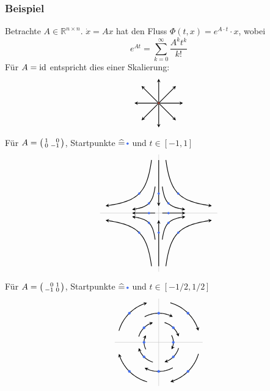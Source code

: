 \subsubsection[Beispiele für dynamische Systeme]{Beispiel} %
\label{ssub:252}
Betrachte $A \in \mathds{R}^{n \times n}$. $\dot x = A x$ hat den Fluss $\Phi(t,x) = e^{A \cdot t} \cdot  x$, wobei
\[
	e^{A t} = \sum_{k=0}^{\infty} \frac{A^k t^k}{k!}  
\]
Für $A= \operatorname{id}$ entspricht dies einer Skalierung:
\[
	\begin{tikzpicture}
		\foreach \x in {0,45,...,315}{
			\draw[arrows={-stealth}, thick] (0,0) -- (\x:1);
		}
		\draw[fill, Tomato3] (0,0) circle (0.03);
	\end{tikzpicture}
\]
Für $A = \begin{psmallmatrix*}[r]
	1 & 0 \\
	0 & -1
\end{psmallmatrix*}$, Startpunkte $\widehat{=}\,{\tikz[baseline=-0.5ex]{\draw[fill, RoyalBlue2] (0,0) circle[radius=0.04];}}$ und $t \in [-1, 1]$
\[
	\begin{tikzpicture}[scale=0.8]
		\draw[Gray0] (-3,0) -- (3,0);
		\draw[Gray0] (0,-3) -- (0,3);
		\begin{scope}
		\foreach \x/\y in {1/1, -1/-1, 1/-1, -1/1, 0.5/0.5, -0.5/-0.5, -0.5/0.5, 0.5/-0.5, 0/1, 0/-1, 0.5/0, -0.5/0}{
			\draw[thick, domain=-1:1, smooth, variable=\t, arrows={-stealth}] plot ({exp(\t)*\x},{exp(-\t)*\y});
			\draw[fill, RoyalBlue2] (\x,\y) circle[radius=0.05];
		}
		\end{scope}
	\end{tikzpicture}
\]
Für $A = \begin{psmallmatrix*}[r]
	0 & 1 \\
	-1 & 0
\end{psmallmatrix*}$, Startpunkte $\widehat{=}\,{\tikz[baseline=-0.5ex]{\draw[fill, RoyalBlue2] (0,0) circle[radius=0.04];}}$ und $t \in [-1/2, 1/2]$
\[
	\begin{tikzpicture}[scale=1.2]
		\draw[Gray0] (-1.5,0) -- (1.5,0);
		\draw[Gray0] (0,-1.5) -- (0,1.5);
		\begin{scope}
		\foreach \x/\y in {1/1, -1/-1, 1/-1, -1/1, 0.5/0.5, -0.5/-0.5, -0.5/0.5, 0.5/-0.5, 0/1, 0/-1, 0.5/0, -0.5/0}{
			\draw[thick, domain=-0.5:0.5, variable=\t, arrows={-stealth}] 
			plot ({\x*cos(deg(\t))+ \y*sin(deg(\t))},{-\x*sin(deg(\t))+ \y*cos(deg(\t))});
			\draw[fill, RoyalBlue2] (\x,\y) circle[radius=0.04];
		}
		\end{scope}
	\end{tikzpicture}
\]
